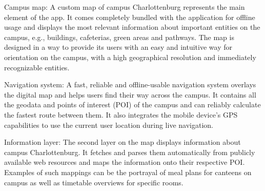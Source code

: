 Campus map: A custom map of campus Charlottenburg represents the main element of the app. It comes completely bundled with the application for offline usage and displays the most relevant information about important entities on the campus, e.g., buildings, cafeterias, green areas and pathways. The map is designed in a way to provide its users with an easy and intuitive way for orientation on the campus, with a high geographical resolution and immediately recognizable entities.

Navigation system: A fast, reliable and offline-usable navigation system overlays the digital map and helps users find their way across the campus. It contains all the geodata and points of interest (POI) of the campus and can reliably calculate the fastest route between them. It also integrates the mobile device's GPS capabilities to use the current user location during live navigation.

Information layer: The second layer on the map displays information about campus Charlottenburg. It fetches and parses them automatically from publicly available web resources and maps the information onto their respective POI. Examples of such mappings can be the portrayal of meal plans for canteens on campus as well as timetable overviews for specific rooms.